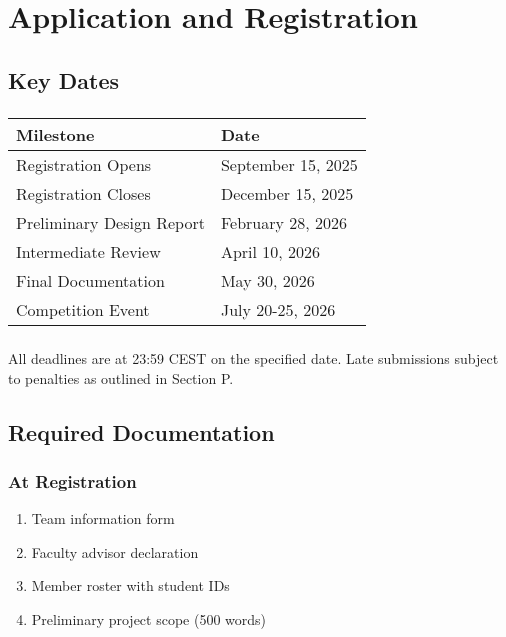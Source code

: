 
\renewcommand{\thesection}{AR}
\section{Application and Registration}

\subsection{Key Dates}

\subsubsection{}

\begin{tabular}{ll}
\toprule
Milestone & Date \\
\midrule
Registration Opens & September 15, 2025 \\
Registration Closes & December 15, 2025 \\
Preliminary Design Report & February 28, 2026 \\
Intermediate Review & April 10, 2026 \\
Final Documentation & May 30, 2026 \\
Competition Event & July 20-25, 2026 \\
\bottomrule
\end{tabular}

\subsubsection{}
All deadlines are at 23:59 CEST on the specified date. Late submissions subject to penalties as outlined in Section P.

\subsection{Required Documentation}

\subsubsection{At Registration}
\begin{enumerate}[noitemsep]
    \item Team information form
    \item Faculty advisor declaration
    \item Member roster with student IDs
    \item Preliminary project scope (500 words)
\end{enumerate}

